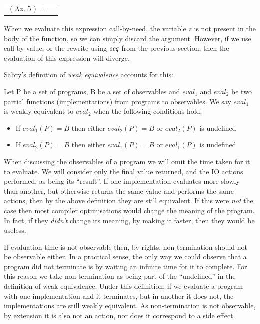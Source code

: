 \qq\qq
\begin{tabular}{ll}
$(\lambda z. \ 5) \ \bot$
\end{tabular}

When we evaluate this expression call-by-need, the variable $z$ is not present in the body of the function, so we can simply discard the argument. However, if we use call-by-value, or the rewrite using $\operatorname{\mathit{seq}}$ from the previous section, then the evaluation of this expression will diverge.

Sabry's definition of \emph{weak equivalence} accounts for this:

Let P be a set of programs, B be a set of observables and $eval_1$ and $eval_2$ be two partial functions (implementations) from programs to observables. We say $eval_1$ is weakly equivalent to $eval_2$ when the following conditions hold:

\begin{itemize}
\item	If $eval_1(P) = B$ then either $eval_2(P) = B$ or $eval_2(P)$ is undefined
\item	If $eval_2(P) = B$ then either $eval_1(P) = B$ or $eval_1(P)$ is undefined
\end{itemize}

When discussing the observables of a program we will omit the time taken for it to evaluate. We will consider only the final value returned, and the IO actions performed, as being its ``result''.  If one implementation evaluates more slowly than another, but otherwise returns the same value and performs the same actions, then by the above definition they are still equivalent. If this were \emph{not} the case then most compiler optimisations would change the meaning of the program. In fact, if they \emph{didn't} change its meaning, by making it faster, then they would be useless.

If evaluation time is not observable then, by rights, non-termination should not be observable either. In a practical sense, the only way we could observe that a program did not terminate is by waiting an infinite time for it to complete. For this reason we take non-termination as being part of the ``undefined'' in the definition of weak equivalence. Under this definition, if we evaluate a program with one implementation and it terminates, but in another it does not, the implementations are still weakly equivalent.  As non-termination is not observable, by extension it is also not an action, nor does it correspond to a side effect.

